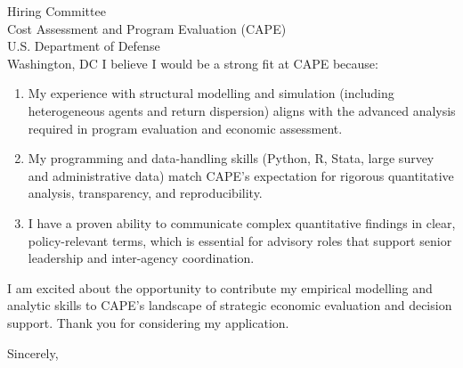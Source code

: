\documentclass[11pt,letterpaper]{letter}
\begin{document}
\begin{letter}{Hiring Committee \\
Cost Assessment and Program Evaluation (CAPE) \\
U.S. Department of Defense \\
Washington, DC}
I believe I would be a strong fit at CAPE because:
\begin{enumerate}
  \item My experience with structural modelling and simulation (including heterogeneous agents and return dispersion) aligns with the advanced analysis required in program evaluation and economic assessment.
  \item My programming and data-handling skills (Python, R, Stata, large survey and administrative data) match CAPE's expectation for rigorous quantitative analysis, transparency, and reproducibility.
  \item I have a proven ability to communicate complex quantitative findings in clear, policy-relevant terms, which is essential for advisory roles that support senior leadership and inter-agency coordination.
\end{enumerate}

I am excited about the opportunity to contribute my empirical modelling and analytic skills to CAPE’s landscape of strategic economic evaluation and decision support. Thank you for considering my application.

\closing{Sincerely,}

\end{letter}
\end{document}
